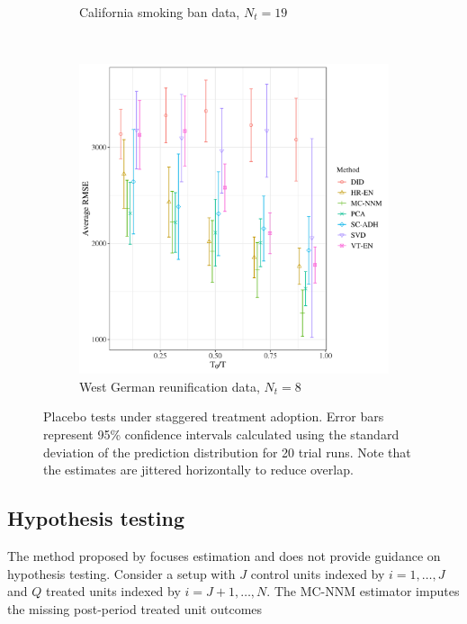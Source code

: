 \documentclass[12pt]{article}
\begin{document}
\begin{figure}[htbp]
\begin{subfigure}[t]{0.48\textwidth}
		\caption{California smoking ban data, $N_t = 19$}
	\end{subfigure}
	~ 
	\begin{subfigure}[t]{0.48\textwidth}
		\centering
		\includegraphics[width=\textwidth]{plots/germany_N_16_T_44_numruns_20_num_treated_8_simultaneuous_0.png}
		\caption{West German reunification data, $N_t = 8$}
	\end{subfigure}
	\caption{Placebo tests under staggered treatment adoption. Error bars represent 95\% confidence intervals calculated using the standard deviation of the prediction distribution for 20 trial runs. Note that the estimates are jittered horizontally to reduce overlap. \label{synth-stag}} 
\end{figure}

\subsection{Hypothesis testing} \label{hyp-test}

The method proposed by \citet{athey2017matrix} focuses estimation and does not provide guidance on hypothesis testing. Consider a setup with $J$ control units indexed by $i=1, \ldots, J$ and $Q$ treated units indexed by $i = J+1, \ldots, N$. The MC-NNM estimator imputes the missing post-period treated unit outcomes 
\end{document}

